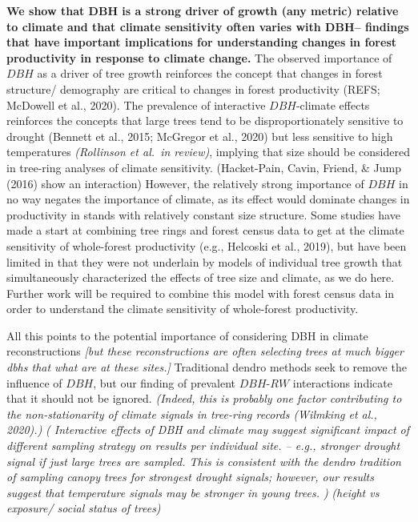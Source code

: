 \documentclass[
]{article}
\begin{document}
\textbf{We show that DBH is a strong driver of growth (any metric)
relative to climate and that climate sensitivity often varies with DBH--
findings that have important implications for understanding changes in
forest productivity in response to climate change.} The observed
importance of \(DBH\) as a driver of tree growth reinforces the concept
that changes in forest structure/ demography are critical to changes in
forest productivity (REFS; McDowell et al., 2020). The prevalence of
interactive \(DBH\)-climate effects reinforces the concepts that large
trees tend to be disproportionately sensitive to drought (Bennett et
al., 2015; McGregor et al., 2020) but less sensitive to high
temperatures \emph{(Rollinson et al.~in review)}, implying that size
should be considered in tree-ring analyses of climate sensitivity.
(Hacket-Pain, Cavin, Friend, \& Jump (2016) show an interaction)
However, the relatively strong importance of \(DBH\) in no way negates
the importance of climate, as its effect would dominate changes in
productivity in stands with relatively constant size structure. Some
studies have made a start at combining tree rings and forest census data
to get at the climate sensitivity of whole-forest productivity (e.g.,
Helcoski et al., 2019), but have been limited in that they were not
underlain by models of individual tree growth that simultaneously
characterized the effects of tree size and climate, as we do here.
Further work will be required to combine this model with forest census
data in order to understand the climate sensitivity of whole-forest
productivity.

All this points to the potential importance of considering DBH in
climate reconstructions \emph{{[}but these reconstructions are often
selecting trees at much bigger dbhs that what are at these sites.{]}}
Traditional dendro methods seek to remove the influence of \(DBH\), but
our finding of prevalent \(DBH\)-\(RW\) interactions indicate that it
should not be ignored. \emph{(Indeed, this is probably one factor
contributing to the non-stationarity of climate signals in tree-ring
records (Wilmking et al., 2020).)} \emph{( Interactive effects of DBH
and climate may suggest significant impact of different sampling
strategy on results per individual site. -- e.g., stronger drought
signal if just large trees are sampled. This is consistent with the
dendro tradition of sampling canopy trees for strongest drought signals;
however, our results suggest that temperature signals may be stronger in
young trees. )} \emph{(height vs exposure/ social status of trees)}
\end{document}
